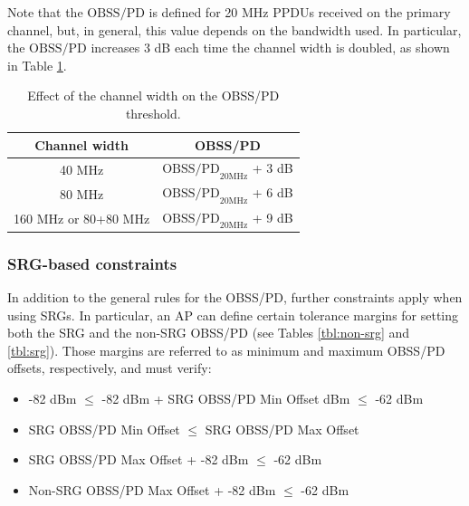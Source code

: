 \documentclass{article}
\begin{document}
Note that the $\text{OBSS/PD}$ is defined for 20 MHz PPDUs received on the primary channel, but, in general, this value depends on the bandwidth used. In particular, the $\text{OBSS/PD}$ increases 3 dB each time the channel width is doubled, as shown in Table \ref{tbl:sensitivity_channel_width}.
\begin{table}[ht!]
	\centering
	\begin{tabular}{|c|c|}
		\hline
		\textbf{Channel width} & \textbf{OBSS/PD} \\ \hline
		40 MHz & $\text{OBSS/PD}_{20 \text{MHz}}$ + 3 dB \\ \hline
		80 MHz & $\text{OBSS/PD}_{20 \text{MHz}}$ + 6 dB \\ \hline
		160 MHz or 80+80 MHz &  $\text{OBSS/PD}_{20 \text{MHz}}$ + 9 dB \\ \hline
	\end{tabular}
	\caption{Effect of the channel width on the OBSS/PD threshold.}
	\label{tbl:sensitivity_channel_width}
\end{table}

\subsubsection{SRG-based constraints}	
In addition to the general rules for the OBSS/PD, further constraints apply when using SRGs. In particular, an AP can define certain tolerance margins for setting both the SRG and the non-SRG OBSS/PD (see Tables \ref{tbl:non-srg} and \ref{tbl:srg}). Those margins are referred to as minimum and maximum OBSS/PD offsets, respectively, and must verify:
\begin{itemize}
	\item -82 dBm $\leq$ -82 dBm + SRG OBSS/PD Min Offset dBm $\leq$ -62 dBm 
	\item SRG OBSS/PD Min Offset $\leq$ SRG OBSS/PD Max Offset
	\item SRG OBSS/PD Max Offset + -82 dBm $\leq$ -62 dBm 
	\item Non-SRG OBSS/PD Max Offset + -82 dBm $\leq$  -62 dBm
\end{itemize}
\end{document}
